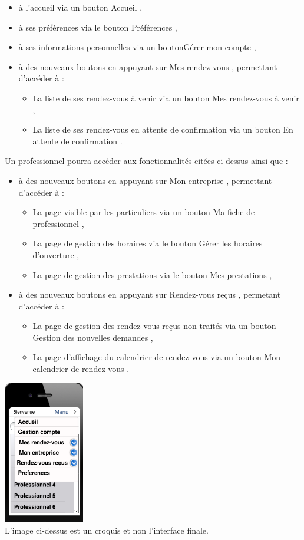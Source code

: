 \documentclass{article}
\begin{document}
\begin{itemize}
\item à l'accueil via un bouton \og Accueil \fg{},
\item à ses préférences via le bouton \og Préférences \fg{},
\item à ses informations personnelles via un bouton\og Gérer mon compte \fg{},
\item à des nouveaux boutons en appuyant sur \og Mes rendez-vous \fg{}, permettant d'accéder à :
	\begin{itemize}
	\item La liste de ses rendez-vous à venir via un bouton \og Mes rendez-vous à venir \fg{},
	\item La liste de ses rendez-vous en attente de confirmation via un bouton \og En attente de confirmation \fg{}.
	\end{itemize}
	
	




\end{itemize}
Un professionnel pourra accéder aux fonctionnalités citées ci-dessus ainsi que :
\begin{itemize}
\item à des nouveaux boutons en appuyant sur \og Mon entreprise \fg{}, permettant d'accéder à :
\begin{itemize}
\item La page visible par les particuliers via un bouton \og Ma fiche de professionnel \fg{},
\item La page de gestion des horaires via le bouton \og Gérer les horaires d'ouverture \fg{},
\item La page de gestion des prestations via le bouton \og Mes prestations \fg{},
\end{itemize}
\item à des nouveaux boutons en appuyant sur  \og Rendez-vous reçus \fg{}, permetant d'accéder à :
\begin{itemize}
\item La page de gestion des rendez-vous reçus non traités via un bouton \og Gestion des nouvelles demandes \fg{},
\item La page d'affichage du calendrier de rendez-vous via un bouton \og Mon calendrier de rendez-vous \fg{}.
\end{itemize}
\end{itemize}
\begin{center}
  \includegraphics[width=100pt]{pro}
  \\L'image ci-dessus est un croquis et non l'interface finale.
\end{center}
\end{document}
